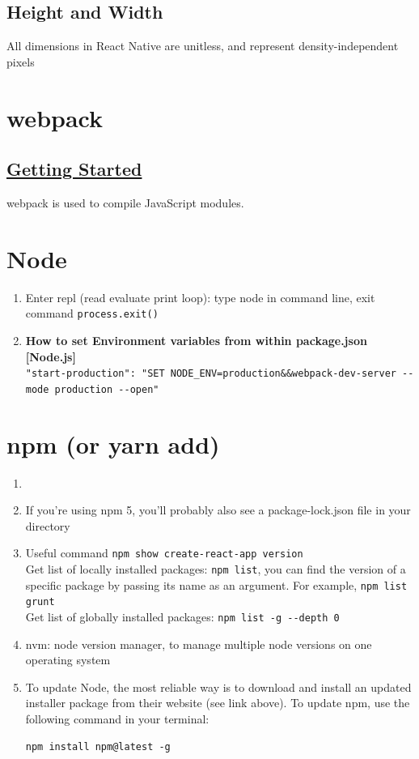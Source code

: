 \documentclass[a4paper, 12pt]{article}
\begin{document}
\subsection{Height and Width}
All dimensions in React Native are unitless, and represent density-independent pixels


\section{webpack}
\subsection{\href{https://webpack.js.org/guides/getting-started/}{Getting Started}}
webpack is used to compile JavaScript modules.


\section{Node}
\begin{enumerate}
\item Enter repl (read evaluate print loop): type node in command line, exit command \verb|process.exit()|
\item \textbf{How to set Environment variables from within package.json [Node.js]}\\
\verb|"start-production": "SET NODE_ENV=production&&webpack-dev-server --mode production --open"|
\end{enumerate}



\section{npm (or yarn add)}
\begin{enumerate}

\item 

\item If you're using npm 5, you'll probably also see a package-lock.json file in your directory

\item Useful command \verb|npm show create-react-app version|\\
Get list of locally installed packages: \verb|npm list|, you can find the version of a specific package by passing its name as an argument. For example, \verb|npm list grunt|\\
Get list of globally installed packages: \verb|npm list -g --depth 0|

\item nvm: node version manager, to manage multiple node versions on one operating system

\item To update Node, the most reliable way is to download and install an updated installer package from their website (see link above). To update npm, use the following command in your terminal:
\begin{verbatim}
npm install npm@latest -g
\end{verbatim}
\end{enumerate}
\end{document}
